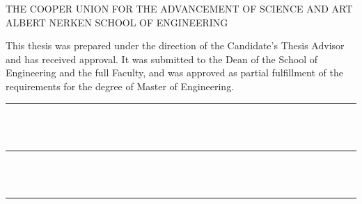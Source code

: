 \thispagestyle{empty}

{
  {
    \MakeUppercase{
      \centering
      The Cooper Union for the Advancement of Science and Art \\
      Albert Nerken School of Engineering \\
    }
  }

  \vs
  
  \noindent{} This thesis was prepared under the direction of the Candidate's Thesis Advisor and has received approval. It was submitted to the Dean of the School of Engineering and the full Faculty, and was approved as partial fulfillment of the requirements for the degree of Master of Engineering.
}

\vfill{}

\begin{singlespace}
  \raggedleft{}
  \rule{0.5\textwidth}{1pt} \\
   \\
\end{singlespace}

\vfill{}

\begin{singlespace}
  \raggedright{}
  \rule{0.5\textwidth}{1pt} \\
   \\
\end{singlespace}

\vfill

\begin{singlespace}
  \raggedleft{}
  \rule{0.5\textwidth}{1pt} \\
   \\
\end{singlespace}

\vfill{}
\vfill{}

